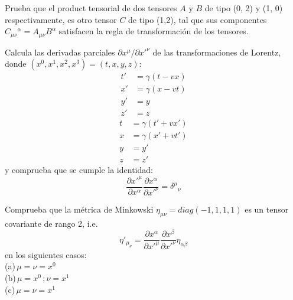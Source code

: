 \documentclass[12pt]{article}
\newenvironment{exercise}[2][Ejercicio]{\begin{trivlist} 
\item[\hskip \labelsep {\bfseries #1}\hskip \labelsep {\bfseries #2.}]}{\end{trivlist}}
\begin{document}
\begin{exercise}{2.10}
Prueba que el product tensorial de dos tensores $A$ y $B$ de tipo (0, 2) y (1, 0) respectivamente, es otro tensor $C$ de tipo (1,2), tal que sus componentes $C_{\mu\nu}{}^{\alpha}=A_{\mu\nu}B^{\alpha}$ satisfacen la regla de transformación de los tensores.
\end{exercise}

\begin{exercise}{2.11}
\end{exercise}

\begin{exercise}{2.12}
\end{exercise}

\begin{exercise}{2.13}
\end{exercise}

\begin{exercise}{2.14}
\end{exercise}

\begin{exercise}{2.15}
Calcula las derivadas parciales $\partial{x^{\mu}}/\partial{x'^{\nu}}$ de las transformaciones de Lorentz, donde $(x^0, x^1, x^2, x^3)=(t,x,y,z)$:
\begin{align*}
t' & =\gamma(t-vx)\\
x' & =\gamma(x-vt)\\
y' & =y\\
z' & =z
\end{align*}
\begin{align*}
t & =\gamma(t'+vx')\\
x & =\gamma(x'+vt')\\
y & =y'\\
z & =z'
\end{align*}
y comprueba que se cumple la identidad:
\[
\frac{\partial{x'^\mu}}{\partial{x^\alpha}}\frac{\partial{x^\alpha}}{\partial{x'^\nu}}=\delta^{\mu}{}_{\nu}
\]
\end{exercise}

\begin{exercise}{2.16}
Comprueba que la métrica de Minkowski $\eta_{\mu\nu}=diag(-1, 1, 1, 1)$ es un tensor covariante de rango 2, i.e.
\[
\eta'_{\mu_\nu}=\frac{\partial{x^\alpha}}{\partial{x'^\mu}}\frac{\partial{x^\beta}}{\partial{x'^\nu}}\eta_{\alpha\beta}
\]
en los siguientes casos:
\\(a)\,$\mu=\nu=x^0$
\\(b)\,$\mu=x^0$\,;\,$\nu=x^1$
\\(c)\,$\mu=\nu=x^1$
\end{exercise}
\end{document}
